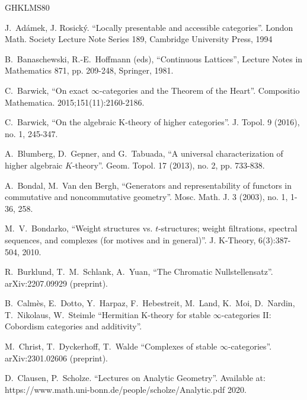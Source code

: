 \documentclass[11pt,leqno]{amsart}
\numberwithin{equation}{section}
\begin{document}
\begin{thebibliography}{GHKLMS80}

J.~Ad\'amek, J. Rosick\'y. ``Locally presentable and accessible categories''. London Math. Society
Lecture Note Series 189, Cambridge University Press, 1994


 B.~Banaschewski, R.-E.~Hoffmann (eds), ``Continuous Lattices'', Lecture Notes in Mathematics 871, pp. 209-248, Springer, 1981.

C.~Barwick, ``On exact $\infty$-categories and the Theorem of the Heart''. Compositio Mathematica. 2015;151(11):2160-2186.

C.~Barwick, ``On the algebraic K-theory of higher categories''. J. Topol. 9 (2016), no. 1,
245-347.

 A.~Blumberg, D.~Gepner, and G.~Tabuada, ``A universal characterization of higher algebraic $K$-theory''. Geom. Topol.
17 (2013), no. 2, pp. 733-838.

 A.~Bondal, M.~Van den Bergh, ``Generators and representability of functors in commutative and
noncommutative geometry''. Mosc. Math. J. 3 (2003), no. 1, 1-36, 258.

 M.~V.~Bondarko, ``Weight structures vs. $t$-structures; weight filtrations, spectral sequences, and complexes (for motives and in general)''. J. K-Theory, 6(3):387-504, 2010.

 R.~Burklund, T.~M.~Schlank, A.~Yuan, ``The Chromatic Nullstellensatz''. arXiv:2207.09929 (preprint).

 B.~Calm\`es, E.~Dotto, Y.~Harpaz, F.~Hebestreit, M.~Land, K.~Moi, D.~Nardin, T.~Nikolaus, W.~Steimle  ``Hermitian K-theory for stable $\infty$-categories II: Cobordism categories and additivity''. 

 M.~Christ, T.~Dyckerhoff, T.~Walde ``Complexes of stable $\infty$-categories''. arXiv:2301.02606 (preprint).


D.~Clausen, P.~Scholze. ``Lectures on Analytic Geometry''. Available at: https://www.math.uni-bonn.de/people/scholze/Analytic.pdf
2020.


\end{thebibliography}
\end{document}
